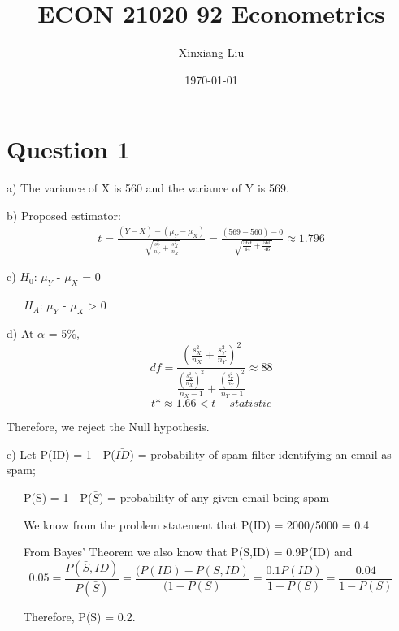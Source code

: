 \documentclass[12pt]{article}%
\begin{document}
\title{ECON 21020 92 Econometrics}
\author{Xinxiang Liu}
\date{\today}
\maketitle


\section{Question 1}
a)  The variance of X is 560 and the variance of Y is 569.\par
\vspace{5mm} %

\noindent b)  Proposed estimator:
\begin{eqnarray*}
t = \frac{(\bar{Y}-\bar{X})-(\mu_Y-\mu_X)}{\sqrt[]{\frac{s_Y^2}{n_Y}+\frac{s_X^2}{n_X}}
} = \frac{(569 - 560) - 0}{\sqrt[]{\frac{569}{44}+\frac{560}{46}}
} \approx 1.796
\end{eqnarray*} 
\vspace{5mm} %

\noindent c) $H_0$: $\mu_Y$ - $\mu_X$ = 0 \par
\vspace{5mm} %
\noindent\                        \                        \ $H_A$: $\mu_Y$ - $\mu_X$ > 0\par
\setlength{\leftskip}{0pt}
\vspace{5mm} %
\noindent d) At $\alpha$ = 5\%, \[df = \frac{(\frac{s_X^2}{n_X}+\frac{s_Y^2}{n_Y})^2}{\frac{(\frac{s_X^2}{n_X})^2}{n_X-1}+\frac{(\frac{s_Y^2}{n_Y})^2}{n_Y-1}}\approx 88\]
\[t*\approx 1.66 < t-statistic\]\par
Therefore, we reject the Null hypothesis. \par
\vspace{5mm} %

\noindent e) Let P(ID) = 1 - P($\bar{ID}$) = probability of spam filter identifying an email as spam; \par
\vspace{5mm} %
\noindent\                        \                        \  P(S) = 1 - P($\bar{S}$) = probability of any given email being spam\par
\vspace{5mm} %
\noindent\                        \                        \  We know from the problem statement that P(ID) = 2000/5000 = 0.4\par
\vspace{5mm} %
\noindent\                        \                        \  From Bayes' Theorem we also know that P(S,ID) = 0.9P(ID) and \\
\[0.05=\frac{P(\bar{S},ID)}{P(\bar{S})}=\frac{(P(ID)-P(S,ID)}{(1-P(S)}=\frac{0.1P(ID)}{1-P(S)}=\frac{0.04}{1-P(S)}\]\par
\noindent\                        \                        \ Therefore, P(S) = 0.2.
\end{document}

